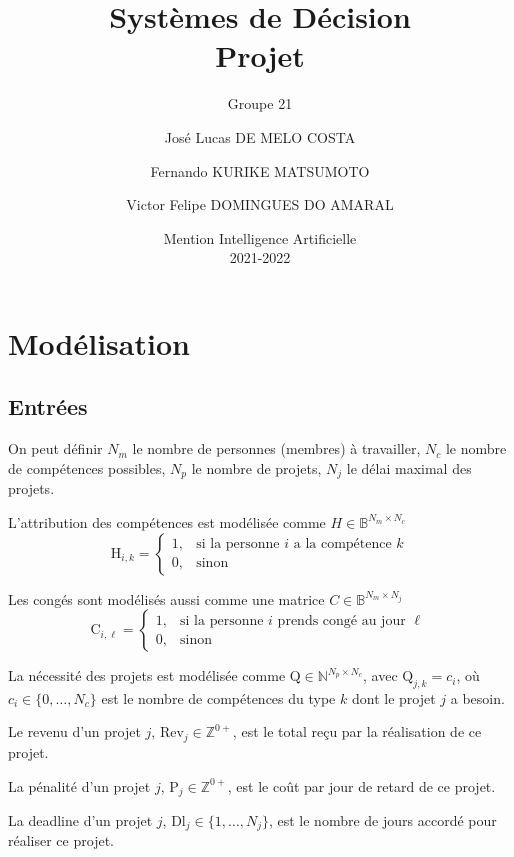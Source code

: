 \documentclass[12pt, a4paper, french, version=last, parskip=half, titlepage]{scrartcl}
\title{Systèmes de Décision \texorpdfstring{\\}{---} Projet}
\subtitle{Groupe 21}
\author{José Lucas DE MELO COSTA \and
Fernando KURIKE MATSUMOTO \and
Victor Felipe DOMINGUES DO AMARAL}
\date{Mention Intelligence Artificielle \\2021-2022}
\begin{document}
\maketitle
\tableofcontents

\section{Modélisation}
\label{sec:modelisation}

\subsection{Entrées}

On peut définir $N_m$ le nombre de personnes (membres) à travailler, $N_c$ le nombre de compétences possibles, $N_p$ le nombre de projets, $N_j$ le délai maximal des projets.

L'attribution des compétences est modélisée comme $H \in \mathbb{B}^{N_m\times N_c}$
\begin{equation*}
    \text{H}_{i,k} = 
    \begin{cases}
        1, & \text{si la personne $i$ a la compétence $k$} \\
        0, & \text{sinon}
    \end{cases}
\end{equation*}

Les congés sont modélisés aussi comme une matrice $C \in \mathbb{B}^{N_m \times N_j}$
\begin{equation*}
    \text{C}_{i,\ell} = 
    \begin{cases}
        1, & \text{si la personne $i$ prends congé au jour $\ell$} \\
        0, & \text{sinon}
    \end{cases}
\end{equation*}

La nécessité des projets est modélisée comme $\text{Q} \in \mathbb{N}^{N_p \times N_c}$, avec $\text{Q}_{j,k} =  c_i$, où $c_i \in \{0, \dots, N_c\}$ est le nombre de compétences du type $k$ dont le projet $j$ a besoin.

Le revenu d'un projet $j$, $\text{Rev}_j \in \mathbb{Z}^{0+}$, est le total reçu par la réalisation de ce projet.

La pénalité d'un projet $j$, $\text{P}_j \in \mathbb{Z}^{0+}$, est le coût par jour de retard de ce projet.

La deadline d'un projet $j$, $\text{Dl}_j \in \{1, \dots, N_j\}$, est le nombre de jours accordé pour réaliser ce projet.
\end{document}
